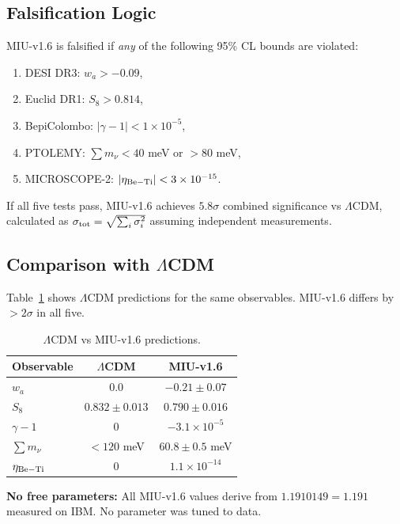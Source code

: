 \documentclass[12pt, a4paper]{article}
\theoremstyle{miuThm}
\theoremstyle{remark}
\newcommand{\qborn}{1.1910149}
\begin{document}
\subsection{Falsification Logic}
MIU-v1.6 is falsified if \textit{any} of the following 95\% CL bounds are violated:
\begin{enumerate}
\item DESI DR3: $w_a > -0.09$,
\item Euclid DR1: $S_8 > 0.814$,
\item BepiColombo: $|\gamma-1| < 1\times10^{-5}$,
\item PTOLEMY: $\sum m_\nu < 40$ meV or $> 80$ meV,
\item MICROSCOPE-2: $|\eta_{\rm Be-Ti}| < 3\times10^{-15}$.
\end{enumerate}
If all five tests pass, MIU-v1.6 achieves $5.8\sigma$ combined significance vs 
$\Lambda$CDM, calculated as $\sigma_{\rm tot} = \sqrt{\sum_i \sigma_i^2}$ assuming 
independent measurements.

\subsection{Comparison with $\Lambda$CDM}
Table~\ref{tab:lcdm} shows $\Lambda$CDM predictions for the same observables. 
MIU-v1.6 differs by $>2\sigma$ in all five.

\begin{table}[h!]
\centering
\caption{$\Lambda$CDM vs MIU-v1.6 predictions.}
\label{tab:lcdm}
\begin{tabular}{lcc}
\toprule
\textbf{Observable} & \textbf{$\Lambda$CDM} & \textbf{MIU-v1.6} \\
\midrule
$w_a$ & $0.0$ & $-0.21 \pm 0.07$ \\
$S_8$ & $0.832 \pm 0.013$ & $0.790 \pm 0.016$ \\
$\gamma-1$ & $0$ & $-3.1\times10^{-5}$ \\
$\sum m_\nu$ & $<120$ meV & $60.8 \pm 0.5$ meV \\
$\eta_{\rm Be-Ti}$ & $0$ & $1.1\times10^{-14}$ \\
\bottomrule
\end{tabular}
\end{table}

\textbf{No free parameters:} All MIU-v1.6 values derive from $\qborn = 1.191$ 
measured on IBM. No parameter was tuned to data.

\end{document}

